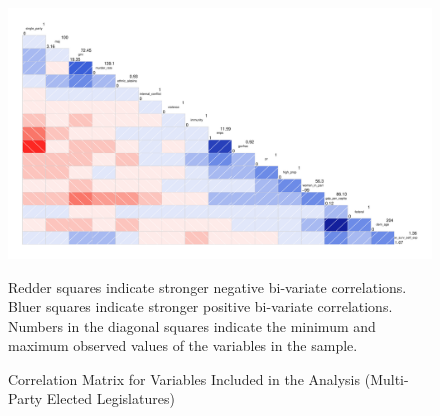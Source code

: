 \documentclass[a4paper]{article}\usepackage[]{graphicx}\usepackage[]{color}
\begin{document}
\begin{landscape}
\begin{figure}[t]

    \begin{center}

    \includegraphics[scale=0.5]{corrScatter.pdf}

    \end{center}

    \caption{Correlation Matrix for Variables Included in the Analysis (Multi-Party Elected Legislatures)}
    \label{corrmatrix}

    \begin{singlespace}
        {\scriptsize{Redder squares indicate stronger negative bi-variate correlations. \\
        Bluer squares indicate stronger positive bi-variate correlations. \\
        Numbers in the diagonal squares indicate the minimum and maximum observed values of the variables in the sample.
        }}
    \end{singlespace}
\end{figure}
\end{landscape}




\end{document}
